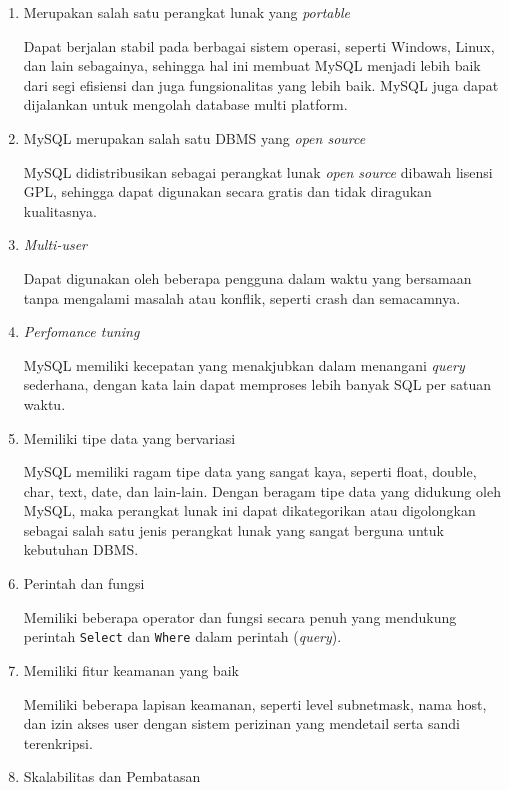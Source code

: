 		\begin{enumerate}
			\item Merupakan salah satu perangkat lunak yang \textit{portable}
			
			Dapat berjalan stabil pada berbagai sistem operasi, seperti Windows, Linux, dan lain sebagainya, sehingga hal ini membuat MySQL menjadi lebih baik dari segi efisiensi dan juga fungsionalitas yang lebih baik. MySQL juga dapat dijalankan untuk mengolah database multi platform. 
			
			\item MySQL merupakan salah satu DBMS yang \textit{open source}
			
			MySQL didistribusikan sebagai perangkat lunak \textit{open source}
			dibawah lisensi GPL, sehingga dapat digunakan secara gratis dan tidak diragukan kualitasnya. 
			
			\item \textit{Multi-user}
			
			Dapat digunakan oleh beberapa pengguna dalam waktu yang bersamaan tanpa mengalami masalah atau konflik, seperti crash dan semacamnya.
			
			\item \textit{Perfomance tuning}
			
			MySQL memiliki kecepatan yang menakjubkan dalam menangani \textit{query} sederhana, dengan kata lain dapat memproses lebih banyak SQL per satuan waktu.
			
			\item Memiliki tipe data yang bervariasi
			
			MySQL memiliki ragam tipe data yang sangat kaya, seperti float, double, char, text, date, dan lain-lain. Dengan beragam tipe data yang didukung oleh MySQL, maka perangkat lunak ini dapat dikategorikan atau digolongkan sebagai salah satu jenis perangkat lunak yang sangat berguna untuk kebutuhan DBMS.
			
			\item Perintah dan fungsi
			
			Memiliki beberapa operator dan fungsi secara penuh yang mendukung perintah \texttt{Select} dan \texttt{Where} dalam perintah (\textit{query}).
			\item Memiliki fitur keamanan yang baik
			
			Memiliki beberapa lapisan keamanan, seperti level subnetmask, nama host, dan izin akses user dengan sistem perizinan yang mendetail serta sandi terenkripsi.
			
			\item Skalabilitas dan Pembatasan
			

\end{enumerate}
